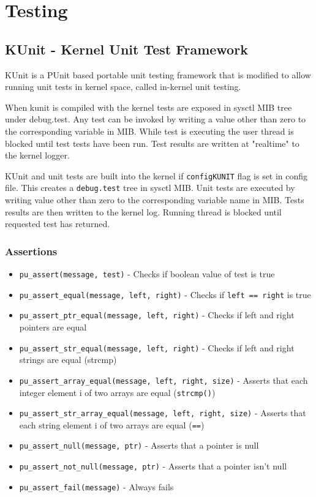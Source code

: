 \part{Testing}

\chapter{KUnit - Kernel Unit Test Framework}

KUnit is a PUnit based portable unit testing framework that is modified to allow
running unit tests in kernel space, called in-kernel unit testing.

When kunit is compiled with the kernel tests are exposed in sysctl MIB tree
under debug.test. Any test can be invoked by writing a value other than zero
to the corresponding variable in MIB. While test is executing the user thread
is blocked until test tests have been run. Test results are written at
"realtime" to the kernel logger.

KUnit and unit tests are built into the kernel if \verb+configKUNIT+ flag is set
in config file. This creates a \verb+debug.test+ tree in sysctl \ac{MIB}. Unit
tests are executed by writing value other than zero to the corresponding
variable name in MIB. Tests results are then written to the kernel log.
Running thread is blocked until requested test has returned.

\section{Assertions}

\begin{itemize}
\item \verb+pu_assert(message, test)+ - Checks if boolean value of test is true
\item \verb+pu_assert_equal(message, left, right)+ - Checks if
      \verb+left == right+ is true
\item \verb+pu_assert_ptr_equal(message, left, right)+ - Checks if left and
      right pointers are equal
\item \verb+pu_assert_str_equal(message, left, right)+ - Checks if left and
      right strings are equal (strcmp)
\item \verb+pu_assert_array_equal(message, left, right, size)+ - Asserts that
      each integer element i of two arrays are equal (\verb+strcmp()+)
\item \verb+pu_assert_str_array_equal(message, left, right, size)+ - Asserts
      that each string element i of two arrays are equal (\verb+==+)
\item \verb+pu_assert_null(message, ptr)+ - Asserts that a pointer is null
\item \verb+pu_assert_not_null(message, ptr)+ - Asserts that a pointer isn't
      null
\item \verb+pu_assert_fail(message)+ - Always fails
\end{itemize}
